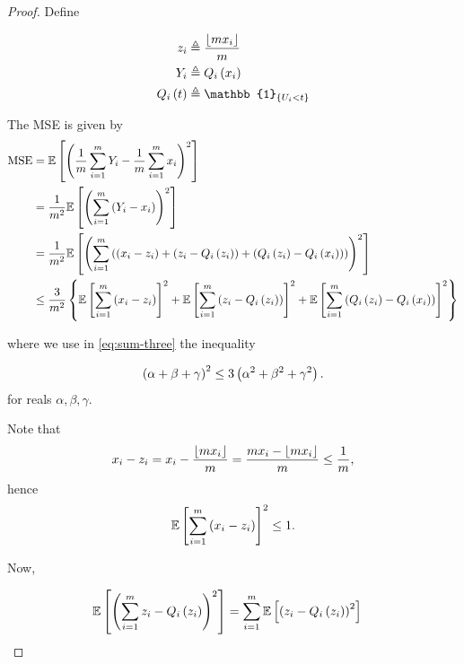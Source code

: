\documentclass[twoside]{article}
\begin{document}
\begin{proof}
    Define

    \begin{align}
        z_i &\triangleq \frac{\floor{mx_i}}{m} \label{eq:zi-def} \\
        Y_i &\triangleq Q_i\brak{x_i} \label{eq:Yi-qi-def} \\
        Q_i\brak{t} &\triangleq \mathbb{1}_{\cbrak{U_i<{t}}} \label{eq:Qi-def}
    \end{align}

    The MSE is given by
    \begin{align}
        \mathrm{MSE} &= \mathbb{E}\left[ \left(\frac{1}{m}\sum_{i=1}^mY_i - \frac{1}{m}\sum_{i=1}^mx_i\right)^2 \right] \\
                     &= \frac{1}{m^2}\mathbb{E}\left[ \left(\sum_{i=1}^m\left(Y_i-x_i\right)\right)^2 \right] \\
                     &= \frac{1}{m^2}\mathbb{E}\left[ \left(\sum_{i=1}^m\left(\left(x_i-z_i\right)+\left(z_i-Q_i\left(z_i\right)\right)+\left(Q_i\left(z_i\right)-Q_i\left(x_i\right)\right)\right)\right)^2 \right] \label{eq:sum-three} \\
                     &\le \frac{3}{m^2}\left\{\mathbb{E}\left[ \sum_{i=1}^m\left(x_i-z_i\right) \right]^2+\mathbb{E}\left[ \sum_{i=1}^m\left(z_i-Q_i\left(z_i\right)\right) \right]^2+\mathbb{E}\left[ \sum_{i=1}^m\left(Q_i\left(z_i\right)-Q_i\left(x_i\right)\right) \right]^2\right\} \\
    \end{align}

    where we use in \eqref{eq:sum-three} the inequality

    \begin{equation}
        \left(\alpha+\beta+\gamma\right)^2 \le 3\left(\alpha^2+\beta^2+\gamma^2\right).
        \label{eq:sum-three-ineq}
    \end{equation}
    for reals \(\alpha,\beta,\gamma\).

    Note that
    \begin{equation}
        x_i-z_i = x_i - \frac{\lfloor mx_i\rfloor}{m} = \frac{mx_i - \lfloor mx_i\rfloor}{m} \le \frac{1}{m},
    \end{equation}
    hence
    \begin{equation}
        \mathbb{E}\left[ \sum_{i=1}^m\left(x_i-z_i\right) \right]^2 \le 1.
        \label{eq:term-1}
    \end{equation}

    Now,

    \begin{align}
        \mathbb{E}\left[ \left(\sum_{i=1}^mz_i-Q_i\left(z_i\right)\right)^2 \right] &= \sum_{i=1}^m\mathbb{E}\left[ \left(z_i-Q_i\left(z_i\right)\right)^2 \right]
    \end{align}
\end{proof}
\end{document}
